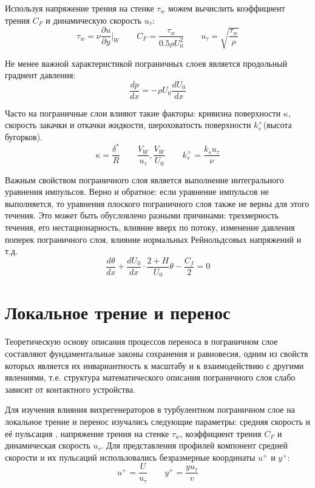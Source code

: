 	Используя напряжение трения на стенке $\tau_w$ можем вычислить коэффициент трения $C_F$ и динамическую скорость $u_\tau$:
	\begin{equation}
		\tau_w = \nu\frac{\partial u}{\partial y}\bigg|_W \qquad C_F = \frac{\tau_w}{0.5\rho U_0^2} \qquad u_\tau = \sqrt{\frac{\tau_w}{\rho}}
	\end{equation}
	
	Не менее важной характеристикой пограничных слоев является продольный градиент давления:
	\begin{equation}
		\frac{dp}{dx} = -\rho U_0 \frac{dU_0}{dx}
	\end{equation}
	
	Часто на пограничные слои влияют такие факторы: кривизна поверхности $\kappa$, скорость закачки и откачки жидкости, шероховатость поверхности $k_s^+$(высота бугорков).
	\begin{equation}
		\kappa = \frac{\delta^*}{R} \qquad \frac{V_W}{u_\tau}, \frac{V_W}{U_0} \qquad k_s^+ = \frac{k_s u_\tau}{\nu}
	\end{equation}
	
	Важным свойством пограничного слоя является выполнение интегрального уравнения импульсов. Верно и обратное: если уравнение импульсов не выполняется, то уравнения плоского пограничного слоя также не верны для этого течения. Это может быть обусловлено разными причинами: трехмерность течения, его нестационарность, влияние вверх по потоку, изменение давления поперек пограничного слоя, влияние нормальных Рейнольдсовых напряжений и т.д.
	\begin{equation}
		\frac{d\theta}{dx} + \frac{dU_0}{dx}\cdot\frac{2 + H}{U_0}\theta - \frac{C_f}{2} = 0
	\end{equation}

\section{Локальное трение и перенос}
	
	Теоретическую основу описания процессов переноса в пограничном слое составляют фундаментальные законы сохранения и равновесия, одним из свойств которых является их инвариантность к масштабу и к взаимодействию с другими явлениями, т.е. структура математического описания пограничного слоя слабо зависит от контактного устройства.
	
	Для изучения влияния вихрегенераторов в турбулентном пограничном слое на локальное трение и перенос изучались следующие параметры: средняя скорость и её пульсация , напряжение трения на стенке $\tau_w$, коэффициент трения $C_F$ и динамическая скорость $u_\tau$.
	Для представления профилей компонент средней скорости и их пульсаций использовались безразмерные координаты $u^+$ и $y^+$:
	\begin{equation}
		u^+ = \frac{U}{u_\tau} \qquad y^+ = \frac{yu_\tau}{v}
	\end{equation}

